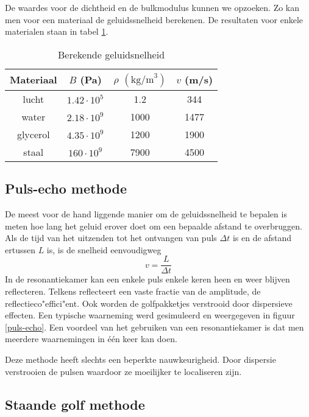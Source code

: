De waardes voor de dichtheid en de bulkmodulus kunnen we opzoeken. Zo kan men 
voor een materiaal de geluidssnelheid berekenen. De resultaten voor enkele 
materialen staan in tabel \ref{speedtable}. 

\begin{table}[htb]
\caption{Berekende geluidsnelheid}
\label{speedtable}
\begin{center}
\begin{tabular}{c||ccc}
Materiaal & $B$ (Pa) & $\rho$ $(\textrm{kg/m}^3)$ & $v$ (m/s) \\\hline
lucht & $1.42 \cdot 10^5$ & 1.2 & 344 \\
water & $2.18 \cdot 10^9$ & 1000 & 1477 \\
glycerol & $4.35 \cdot 10^9$ & 1200 & 1900 \\
staal & $160 \cdot 10^9$ & 7900 & 4500 \\
\end{tabular}
\end{center}
\end{table}

\subsection{Puls-echo methode}
De meest voor de hand liggende manier om de geluidssnelheid te bepalen is meten 
hoe lang het geluid erover doet om een bepaalde afstand te overbruggen. Als de 
tijd van het uitzenden tot het ontvangen van puls $\Delta t$ is en de afstand 
ertussen $L$ is, is de snelheid eenvoudigweg
$$
v = \frac{L}{\Delta t}
$$
In de resonantiekamer kan een enkele puls enkele keren heen en weer blijven 
reflecteren. Telkens reflecteert een vaste fractie van de amplitude, de 
reflectieco"effici"ent. Ook worden de golfpakketjes verstrooid door dispersieve 
effecten. Een typische waarneming werd gesimuleerd en weergegeven in figuur 
\ref{puls-echo}. Een voordeel van het gebruiken van een resonantiekamer is dat
men meerdere waarnemingen in \'e\'en keer kan doen.


Deze methode heeft slechts een beperkte nauwkeurigheid. Door dispersie 
verstrooien de pulsen waardoor ze moeilijker te localiseren zijn.

\subsection{Staande golf methode}

